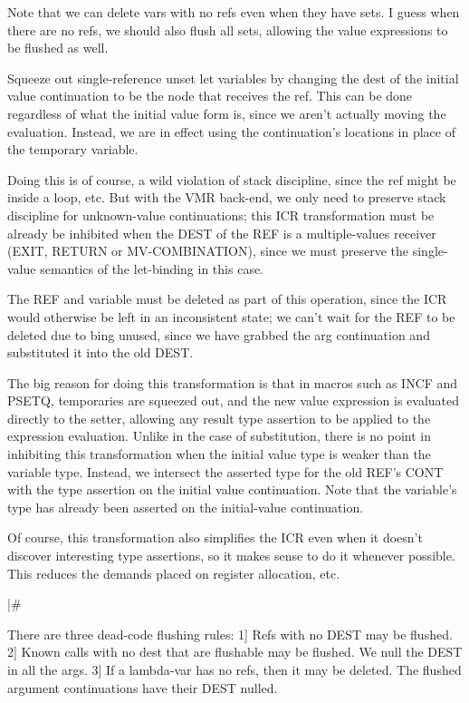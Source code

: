 Note that we can delete vars with no refs even when they have sets.  I guess
when there are no refs, we should also flush all sets, allowing the value
expressions to be flushed as well.

Squeeze out single-reference unset let variables by changing the dest of the
initial value continuation to be the node that receives the ref.  This can be
done regardless of what the initial value form is, since we aren't actually
moving the evaluation.  Instead, we are in effect using the continuation's
locations in place of the temporary variable.  

Doing this is of course, a wild violation of stack discipline, since the ref
might be inside a loop, etc.  But with the VMR back-end, we only need to
preserve stack discipline for unknown-value continuations; this ICR
transformation must be already be inhibited when the DEST of the REF is a
multiple-values receiver (EXIT, RETURN or MV-COMBINATION), since we must
preserve the single-value semantics of the let-binding in this case.

The REF and variable must be deleted as part of this operation, since the ICR
would otherwise be left in an inconsistent state; we can't wait for the REF to
be deleted due to bing unused, since we have grabbed the arg continuation and
substituted it into the old DEST.

The big reason for doing this transformation is that in macros such as INCF and
PSETQ, temporaries are squeezed out, and the new value expression is evaluated
directly to the setter, allowing any result type assertion to be applied to the
expression evaluation.  Unlike in the case of substitution, there is no point
in inhibiting this transformation when the initial value type is weaker than
the variable type.  Instead, we intersect the asserted type for the old REF's
CONT with the type assertion on the initial value continuation.  Note that the
variable's type has already been asserted on the initial-value continuation.

Of course, this transformation also simplifies the ICR even when it doesn't
discover interesting type assertions, so it makes sense to do it whenever
possible.  This reduces the demands placed on register allocation, etc.

|\#

There are three dead-code flushing rules:
 1] Refs with no DEST may be flushed.
 2] Known calls with no dest that are flushable may be flushed.  We null the
    DEST in all the args.
 3] If a lambda-var has no refs, then it may be deleted.  The flushed argument
    continuations have their DEST nulled.

